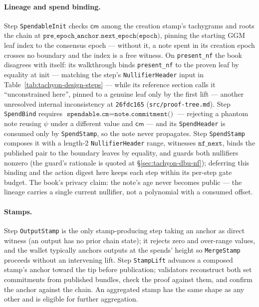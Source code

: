\documentclass[11pt,a4paper]{article}
\theoremstyle{definition}
\newcommand{\cmsym}{\mathsf{cm}}
\begin{document}
\paragraph{Lineage and spend binding.} Step \texttt{SpendableInit} checks
$\cmsym$ among the creation stamp's tachygrams and roots the chain at
$\texttt{pre\_epoch\_anchor.next\_epoch(epoch)}$, pinning the starting GGM
leaf index to the consensus epoch --- without it, a note spent in its
creation epoch crosses no boundary and the index is a free witness. On
\texttt{present\_nf} the book disagrees with itself: its walkthrough binds
\texttt{present\_nf} to the proven leaf by equality at init --- matching
the step's \texttt{NullifierHeader} input in
Table~\ref{tab:tachyon-design-steps} --- while its reference section calls
it ``unconstrained here'', pinned to a genuine leaf only by the first lift
--- another unresolved internal inconsistency at \texttt{26fdc165}
(\texttt{src/proof-tree.md}). Step \texttt{SpendBind} requires
$\texttt{spendable.cm} = \texttt{note.commitment()}$ --- rejecting a
phantom note reusing $\psi$ under a different value and $\cmsym$ --- and
its \texttt{SpendHeader} is consumed only by \texttt{SpendStamp}, so the
note never propagates. Step \texttt{SpendStamp} composes it with a length-2
\texttt{NullifierHeader} range, witnesses $\texttt{nf\_next}$, binds the
published pair to the boundary leaves by equality, and guards both
nullifiers nonzero (the guard's rationale is quoted at
\S\ref{sec:tachyon-dbu-nf}); deferring this binding and the action
digest here keeps each step within its per-step gate budget. The book's
privacy claim: the note's age never becomes public --- the lineage carries
a single current nullifier, not a polynomial with a consumed offset.

\paragraph{Stamps.} Step \texttt{OutputStamp} is the only stamp-producing
step taking an anchor as direct witness (an output has no prior chain
state); it rejects zero and over-range values, and the wallet typically
anchors outputs at the spends' height so \texttt{MergeStamp} proceeds
without an intervening lift. Step \texttt{StampLift} advances a composed
stamp's anchor toward the tip before publication; validators reconstruct
both set commitments from published bundles, check the proof against them,
and confirm the anchor against the chain. An aggregated stamp has the same
shape as any other and is eligible for further aggregation.
\end{document}
